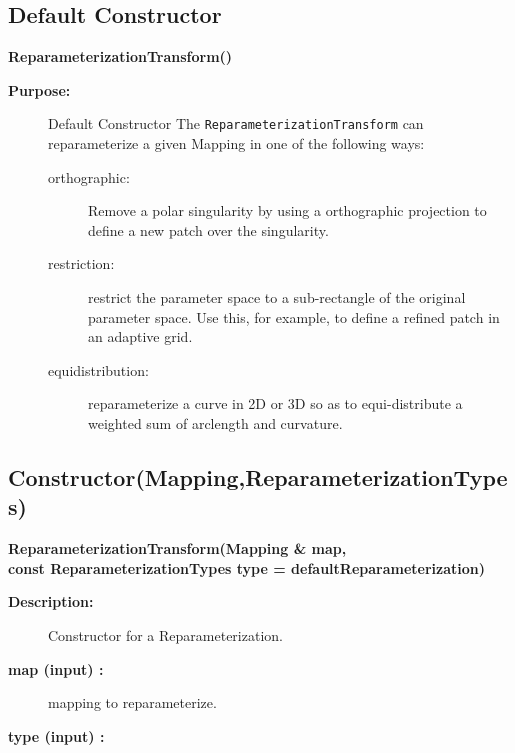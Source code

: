 \subsection{Default Constructor}
 
\newlength{\ReparameterizationTransformIncludeArgIndent}
\begin{flushleft} \textbf{%
\settowidth{\ReparameterizationTransformIncludeArgIndent}{ReparameterizationTransform(}%
ReparameterizationTransform() 
}\end{flushleft}
\begin{description}
\item[{\bf Purpose:}]  Default Constructor
    The {\tt ReparameterizationTransform} can reparameterize a given Mapping
 in one of the following ways:
   \begin{description}
      \item[orthographic:] Remove a polar singularity by using a orthographic projection
         to define a new patch over the singularity.
      \item[restriction:] restrict the parameter space to a sub-rectangle of the
          original parameter space. Use this, for example, to define a refined patch in an
          adaptive grid.
      \item[equidistribution:] reparameterize a curve in 2D or 3D so as to equi-distribute
         a weighted sum of arclength and curvature.   
   \end{description}   
\end{description}
\subsection{Constructor(Mapping,ReparameterizationTypes)}
 
\begin{flushleft} \textbf{%
\settowidth{\ReparameterizationTransformIncludeArgIndent}{ReparameterizationTransform(}%
ReparameterizationTransform(Mapping \& map, \\ 
\hspace{\ReparameterizationTransformIncludeArgIndent}const ReparameterizationTypes type  = defaultReparameterization) 
}\end{flushleft}
\begin{description}
\item[{\bf Description:}]  Constructor for a Reparameterization. 
\item[{\bf map (input) :}]  mapping to reparameterize.
\item[{\bf type (input) :}]  
\end{description}
